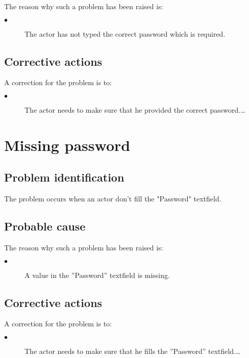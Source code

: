 The reason why such a problem has been raised is:\\
\begin{description}
\item[$\bullet$] The actor has not typed the correct password which is
required.
\end{description}


\subsection{Corrective actions}

A correction for the problem is to:\\
\begin{description}
\item[$\bullet$] The actor needs to make sure that he provided the correct
password.\ldots

\end{description}



\section{Missing password} 

\subsection{Problem identification}
The problem occurs when an actor don't fill the "Password" textfield.

\subsection{Probable cause}

The reason why such a problem has been raised is:\\
\begin{description}
\item[$\bullet$] A value in the ''Password'' textfield is missing.
\end{description}


\subsection{Corrective actions}

A correction for the problem is to:\\
\begin{description}
\item[$\bullet$] The actor needs to make sure that he fills the
''Password'' textfield.\ldots

\end{description}



